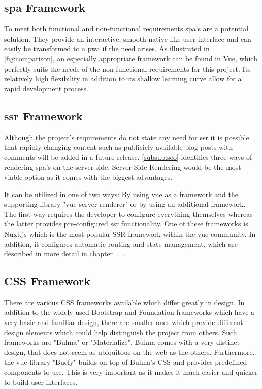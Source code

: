 \subsection{\acrshort{spa} Framework}
To meet both functional and non-functional requirements \acrshort{spa}'s are a potential solution. They provide an interactive, smooth native-like user interface and can easily be transformed to a \acrfull{pwa} if the need arises. As illustrated in \autoref{fig:comparison}, an especially appropriate framework can be found in Vue, which perfectly suits the needs of the non-functional requirements for this project. Its relatively high flexibility in addition to its shallow learning curve allow for a rapid development process.

\subsection{\acrshort{ssr} Framework}
Although the project's requirements do not state any need for \acrshort{ssr} it is possible that rapidly changing content such as publicicly available blog posts with comments will be added in a future release. \autoref{subsub:seo} identifies three ways of rendering \acrshort{spa}'s on the server side. Server Side Rendering would be the most viable option as it comes with the biggest advantages. 

It can be utilized in one of two ways: By using vue as a framework and the supporting library "vue-server-renderer" or by using an additional framework. The first way requires the developer to configure everything themselves whereas the latter provides pre-configured \acrshort{ssr} functionality. One of these frameworks is Nuxt.js which is the most  popular SSR framework within the vue community. In addition, it configures automatic routing and state management, which are described in more detail in chapter ... . 

\subsection{CSS Framework}
There are various CSS frameworks available which differ greatly in design. In addition to the widely used Bootstrap and Foundation frameworks which have a very basic and familiar design, there are smaller ones which provide different design elements which could help distinguish the project from others. Such frameworks are "Bulma" or "Materialize". Bulma comes with a very distinct design, that does not seem as ubiquitous on the web as the others. Furthermore, the vue library "Buefy" builds on top of Bulma's CSS and provides predefined components to use. This is very important as it makes it much easier and quicker to build user interfaces.

